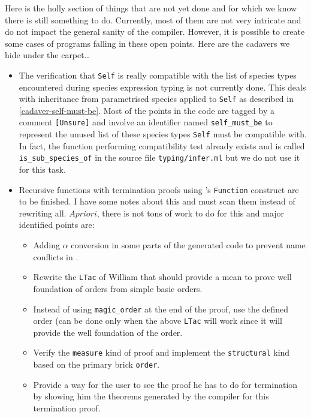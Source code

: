 
Here is the holly section of things that are not yet done and for
which we know there is still something to do. Currently, most of them
are not very intricate and do not impact the general sanity of the
compiler. However, it is possible to create some cases of programs
falling in these open points. Here are the cadavers we hide under the
carpet\ldots\smiley


\begin{itemize}
\item The verification that {\tt Self} is really compatible with the
  list of species types encountered during species expression typing
  is not currently done. This deals with inheritance from parametrised
  species applied to {\tt Self} as described in
  \ref{cadaver-self-must-be}. Most of the points in the code are
  tagged by a comment {\tt [Unsure]} and involve an identifier
  named {\tt self\_must\_be} to represent the unused list of these
  species types {\tt Self} must be compatible with. In fact, the
  function performing compatibility test already exists and is called
  {\tt is\_sub\_species\_of} in the source file {\tt typing/infer.ml}
  but we do not use it for this task.

\item Recursive functions with termination proofs using \coq's
  {\tt Function} construct are to be finished. I have some notes
  about this and must scan them instead of rewriting all. $A
  priori$, there is not tons of work to do for this and major
  identified points are:
  \begin{itemize}
  \item Adding $\alpha$ conversion in some parts of the generated
    code to prevent name conflicts in \coq.
  \item Rewrite the {\tt LTac} of William that should provide a mean
    to prove well foundation of orders from simple basic orders.
  \item Instead of using {\tt magic\_order} at the end of the proof,
    use the defined order (can be done only when the above {\tt LTac}
    will work since it will provide the well foundation of the
    order.
  \item Verify the {\tt measure} kind of proof and implement the
    {\tt structural} kind based on the primary brick {\tt order}.
  \item Provide a way for the user to see the proof he has to do for
    termination by showing him the theorems generated by the compiler
    for this termination proof.
  \end{itemize}


\end{itemize}
